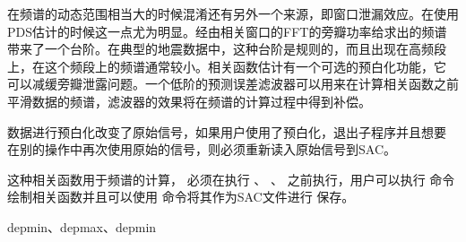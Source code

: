 在频谱的动态范围相当大的时候混淆还有另外一个来源，即窗口泄漏效应。在使用
PDS估计的时候这一点尤为明显。经由相关窗口的FFT的旁瓣功率给求出的频谱
带来了一个台阶。在典型的地震数据中，这种台阶是规则的，而且出现在高频段
上，在这个频段上的频谱通常较小。相关函数估计有一个可选的预白化功能，它
可以减缓旁瓣泄露问题。一个低阶的预测误差滤波器可以用来在计算相关函数之前
平滑数据的频谱，滤波器的效果将在频谱的计算过程中得到补偿。

数据进行预白化改变了原始信号，如果用户使用了预白化，退出子程序并且想要
在别的操作中再次使用原始的信号，则必须重新读入原始信号到SAC。

这种相关函数用于频谱的计算， 必须在执行 、
、 之前执行，用户可以执行 
命令绘制相关函数并且可以使用  命令将其作为SAC文件进行
保存。

depmin、depmax、depmin
